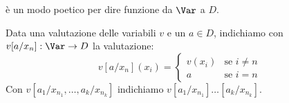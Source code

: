 \begin{definition}
     è un modo poetico per dire funzione da $\Var$ a $D$.
\end{definition}

\begin{notation}
    Data una valutazione delle variabili $v$ e un $a \in D$, indichiamo con $v[a/x_n] : \Var \to D$ la valutazione:
    \[ v[a/x_n](x_i) = \begin{cases}
        v(x_i) &\text{se $i \neq n$} \\
        a &\text{se $i = n$}
    \end{cases}
    \]
    Con $v[a_1/x_{n_1},\ldots,a_k/x_{n_k}]$ indichiamo $v[a_1/x_{n_1}]\ldots[a_k/x_{n_k}]$.
\end{notation}

